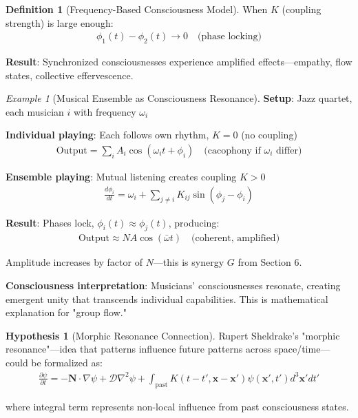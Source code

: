 \documentclass[11pt,a4paper]{article}
\theoremstyle{definition}
\newtheorem{definition}{Definition}[section]
\newtheorem{hypothesis}{Hypothesis}[section]
\theoremstyle{remark}
\newtheorem{example}{Example}[section]
\begin{document}
\begin{small}
\begin{enumerate}
\begin{definition}[Frequency-Based Consciousness Model]
When \(K\) (coupling strength) is large enough:
\begin{align}
\phi_1(t) - \phi_2(t) \to 0 \quad \text{(phase locking)}
\end{align}

\textbf{Result}: Synchronized consciousnesses experience amplified effects—empathy, flow states, collective effervescence.
\end{definition}

\begin{example}[Musical Ensemble as Consciousness Resonance]
\textbf{Setup}: Jazz quartet, each musician \(i\) with frequency \(\omega_i\)

\textbf{Individual playing}: Each follows own rhythm, \(K = 0\) (no coupling)
\begin{align}
\text{Output} = \sum_i A_i \cos(\omega_i t + \phi_i) \quad \text{(cacophony if } \omega_i \text{ differ)}
\end{align}

\textbf{Ensemble playing}: Mutual listening creates coupling \(K > 0\)
\begin{align}
\frac{d\phi_i}{dt} = \omega_i + \sum_{j \neq i} K_{ij}\sin(\phi_j - \phi_i)
\end{align}

\textbf{Result}: Phases lock, \(\phi_i(t) \approx \phi_j(t)\), producing:
\begin{align}
\text{Output} \approx NA\cos(\bar{\omega}t) \quad \text{(coherent, amplified)}
\end{align}

Amplitude increases by factor of \(N\)—this is synergy \(G\) from Section 6.

\textbf{Consciousness interpretation}: Musicians' consciousnesses resonate, creating emergent unity that transcends individual capabilities. This is mathematical explanation for "group flow."
\end{example}

\begin{hypothesis}[Morphic Resonance Connection]
Rupert Sheldrake's "morphic resonance"—idea that patterns influence future patterns across space/time—could be formalized as:
\begin{align}
\frac{\partial \psi}{\partial t} = -\mathbf{N} \cdot \nabla \psi + \mathcal{D}\nabla^2 \psi + \int_{\text{past}} K(t-t', \mathbf{x}-\mathbf{x}') \psi(\mathbf{x}', t') d^3\mathbf{x}' dt'
\end{align}

where integral term represents non-local influence from past consciousness states.


\end{hypothesis}
\end{enumerate}
\end{small}
\end{document}
